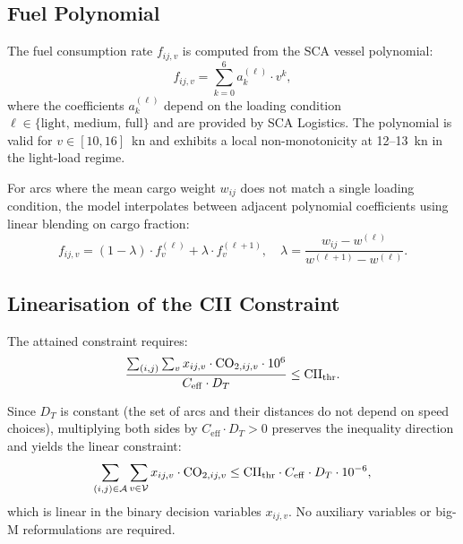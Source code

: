 \subsection{Fuel Polynomial}
\label{app:notation:polynomial}

The fuel consumption rate $f_{ij,v}$ is computed from the SCA vessel
polynomial:
\begin{equation}
  f_{ij,v} = \sum_{k=0}^{6} a_k^{(\ell)} \cdot v^k,
  \label{eq:fuel_poly_app}
\end{equation}
where the coefficients $a_k^{(\ell)}$ depend on the loading condition
$\ell \in \{\text{light, medium, full}\}$ and are provided by SCA Logistics.
The polynomial is valid for $v \in [10, 16]$~kn and exhibits a
local non-monotonicity at 12--13~kn in the light-load regime.

For arcs where the mean cargo weight $w_{ij}$ does not match a single
loading condition, the model interpolates between adjacent polynomial
coefficients using linear blending on cargo fraction:
\begin{equation}
  f_{ij,v} = (1-\lambda) \cdot f_v^{(\ell)} + \lambda \cdot f_v^{(\ell+1)},
  \quad \lambda = \frac{w_{ij} - w^{(\ell)}}{w^{(\ell+1)} - w^{(\ell)}}.
\end{equation}

\subsection{Linearisation of the CII Constraint}
\label{app:notation:linearisation}

The attained \CII{} constraint requires:
\begin{equation}
  \frac{\sum_{(i,j)} \sum_v x_{ij,v} \cdot \mathrm{CO}_{2,ij,v} \cdot 10^6}{C_{\mathrm{eff}} \cdot D_T} \leq \mathrm{CII}_{\mathrm{thr}}.
  \label{eq:cii_constraint_app}
\end{equation}

Since $D_T$ is constant (the set of arcs and their distances do not depend
on speed choices), multiplying both sides by $C_{\mathrm{eff}} \cdot D_T > 0$
preserves the inequality direction and yields the linear constraint:
\begin{equation}
  \sum_{(i,j) \in \mathcal{A}} \sum_{v \in \mathcal{V}} x_{ij,v} \cdot \mathrm{CO}_{2,ij,v}
  \leq \mathrm{CII}_{\mathrm{thr}} \cdot C_{\mathrm{eff}} \cdot D_T \cdot 10^{-6},
  \label{eq:cii_linear_app}
\end{equation}
which is linear in the binary decision variables $x_{ij,v}$.  No
auxiliary variables or big-M reformulations are required.
